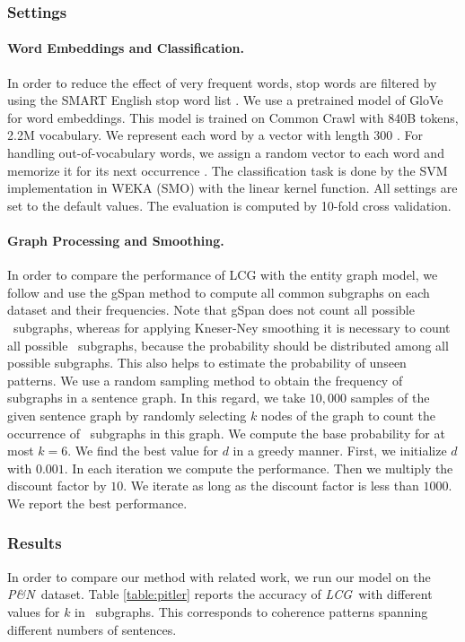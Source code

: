 \subsubsection{Settings}
\paragraph{Word Embeddings and Classification.} In order to reduce the
effect of very frequent words, stop words are filtered by using the
SMART English stop word list \cite{salton71}. We use a pre\-trained
model of GloVe for word embeddings. This model is trained on Common
Crawl with 840B tokens, 2.2M vocabulary. We represent each word by a
vector with length 300 \cite{pennington14}.  For handling
out-of-vocabulary words, we assign a random vector to each word and
memorize it for its next occurrence \cite{kusner15}. 
The classification task is done by the SVM implementation in WEKA (SMO)
with the linear kernel function. All settings are set to the default
values. The evaluation is computed by 10-fold cross validation.

\paragraph{Graph Processing and Smoothing.} In order to compare the
performance of LCG with the entity graph model, we follow
 and use the gSpan method \cite{yanxifeng02} to compute all common
subgraphs on each dataset and their frequencies. Note that gSpan
does not count all possible \knode\ subgraphs, whereas for applying
Kneser-Ney smoothing it is necessary to count all possible \knode\
subgraphs, because the probability should be distributed among all
possible subgraphs.  This also helps to estimate the probability of
unseen patterns. We use a random sampling method \cite{shervashidze09}
to obtain the frequency of subgraphs in a sentence graph. In this
regard, we take $10,000$ samples of the given sentence graph by
randomly selecting $k$ nodes of the graph to count the occurrence of
\knode\ subgraphs in this graph. We compute the base probability for
at most $k = 6$. We find the best value for $d$ in a greedy
manner. First, we initialize $d$ with $0.001$. In each iteration we
compute the performance. Then we multiply the discount factor by $10$. We
iterate as long as the discount factor is less than $1000$. We report
the best performance.

\subsubsection{Results}
%
In order to compare our method with related work, we run our model on
the \emph{P\&N}\ dataset. Table \ref{table:pitler} reports the accuracy
of \emph{LCG}\ with different values for $k$ in \knode\
subgraphs. This corresponds to coherence patterns spanning
different numbers of sentences.

